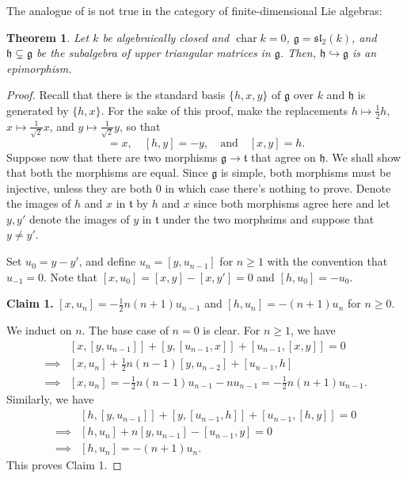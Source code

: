 \documentclass[12pt]{article}
\theoremstyle{thmstyle}
\newtheorem{theorem}{Theorem}[section]
\theoremstyle{defstyle}
\newcommand{\chr}{\operatorname{char}}
\newcommand{\frakg}{\mathfrak{g}}
\newcommand{\frakh}{\mathfrak{h}}
\newcommand{\frakt}{\mathfrak{t}}
\newcommand{\into}{\hookrightarrow}
\renewcommand{\ge}{\geqslant}
\begin{document}
The analogue of  is not true in the category of finite-dimensional Lie algebras: 

\begin{theorem}
    Let $k$ be algebraically closed and $\chr k = 0$, $\frakg = \mathfrak{sl}_2(k)$, and $\frakh\subsetneq\frakg$ be the subalgebra of upper triangular matrices in $\frakg$. Then, $\frakh\into\frakg$ is an epimorphism.
\end{theorem}
\begin{proof}
    Recall that there is the standard basis $\{h, x, y\}$ of $\frakg$ over $k$ and $\frakh$ is generated by $\{h, x\}$. For the sake of this proof, make the replacements $h\mapsto\frac{1}{2}h$, $x\mapsto\frac{1}{\sqrt 2}x$, and $y\mapsto\frac{1}{\sqrt 2}y$, so that 
    \begin{equation*}
        [h, x] = x,\quad [h, y] = -y,\quad\text{and}\quad[x, y] = h.
    \end{equation*}
    Suppose now that there are two morphisms $\frakg\to\frakt$ that agree on $\frakh$. We shall show that both the morphisms are equal. Since $\frakg$ is simple, both morphisms must be injective, unless they are both $0$ in which case there's nothing to prove. Denote the images of $h$ and $x$ in $\frakt$ by $h$ and $x$ since both morphisms agree here and let $y, y'$ denote the images of $y$ in $\frakt$ under the two morphsims and suppose that $y\ne y'$.

    Set $u_0 = y - y'$, and define $u_n = [y, u_{n - 1}]$ for $n\ge 1$ with the convention that $u_{-1} = 0$. Note that $[x, u_0] = [x, y] - [x, y'] = 0$ and $[h, u_0] = -u_0$.

    \noindent\textbf{Claim 1.} $[x, u_n] = -\frac{1}{2}n(n + 1)u_{n - 1}$ and $[h, u_n] = -(n + 1)u_{n}$ for $n\ge 0$.

    \noindent We induct on $n$. The base case of $n = 0$ is clear. For $n\ge 1$, we have 
    \begin{align*}
        &[x, [y, u_{n - 1}]] + [y, [u_{n - 1}, x]] + [u_{n - 1}, [x, y]] = 0\\
        \implies&[x, u_n] + \frac{1}{2}n(n - 1)[y, u_{n - 2}] + [u_{n - 1}, h]\\
        \implies &[x, u_n] = -\frac{1}{2}n(n - 1)u_{n - 1} - nu_{n - 1} = -\frac{1}{2}n(n + 1)u_{n - 1}.
    \end{align*}
    Similarly, we have 
    \begin{align*}
        &[h, [y, u_{n - 1}]] + [y, [u_{n - 1}, h]] + [u_{n - 1}, [h, y]] = 0\\
        \implies&[h, u_n] + n[y, u_{n - 1}] - [u_{n - 1}, y] = 0\\
        \implies&[h, u_n] = -(n + 1)u_n.
    \end{align*}
    This proves Claim 1.


\end{proof}
\end{document}
